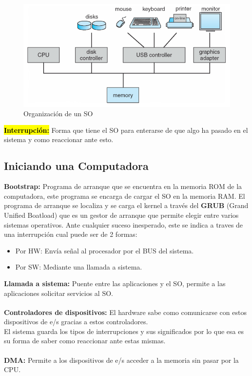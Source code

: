 \documentclass{templateNote}
\begin{document}
\begin{figure}[H]
    \centering
    \includegraphics[width=\textwidth]{img/organizacion.png}
    \caption{Organización de un SO}
\end{figure}

\noindent\textbf{\hl{Interrupción:}} Forma que tiene el SO para enterarse de que algo ha pasado en el sistema y como reaccionar ante esto.

\subsection*{Iniciando una Computadora}
\noindent\textbf{Bootstrap:} Programa de arranque que se encuentra en la memoria ROM de la computadora, este programa se encarga de cargar el SO en la memoria RAM.
El programa de arranque se localiza y se carga el kernel a través del \textbf{GRUB} (Grand Unified Boatload) que es un gestor de arranque que permite elegir entre varios sistemas operativos.
Ante cualquier suceso inesperado, este se indica a traves de una interrupción cual puede ser de 2 formas:
\begin{itemize}
    \item Por HW: Envía señal al procesador por el BUS del sistema.
    \item Por SW: Mediante una llamada a sistema.
\end{itemize}
\noindent\textbf{Llamada a sistema:} Puente entre las aplicaciones y el SO, permite a las aplicaciones solicitar servicios al SO.
\\\\
\noindent\textbf{Controladores de dispositivos:} El hardware sabe como comunicarse con estos dispositivos de e/s gracias a estos controladores.
\\El sistema guarda los tipos de interrupciones y sus significados por lo que esa es su forma de saber como reaccionar ante estas mismas.
\\\\
\noindent\textbf{DMA:} Permite a los dispositivos de e/s acceder a la memoria sin pasar por la CPU.
\newpage
\end{document}
